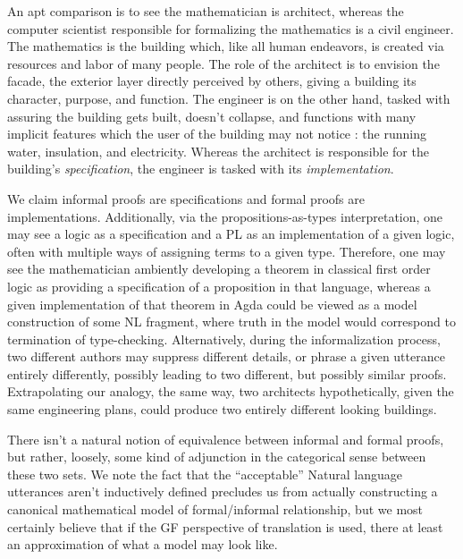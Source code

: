 An apt comparison is to see the mathematician is architect, whereas the computer
scientist responsible for formalizing the mathematics is a civil engineer. The
mathematics is the building which, like all human endeavors, is created via
resources and labor of many people. The role of the architect is to envision the
facade, the exterior layer directly perceived by others, giving a building its
character, purpose, and function. The engineer is on the other hand, tasked with
assuring the building gets built, doesn't collapse, and functions with many
implicit features which the user of the building may not notice : the running
water, insulation, and electricity. Whereas the architect is responsible for the
building's \emph{specification}, the engineer is tasked with its
\emph{implementation}.

We claim informal proofs are specifications and formal proofs are implementations.
Additionally, via the propositions-as-types interpretation, one may see a logic
as a specification and a PL as an implementation of a given logic, 
often with multiple ways of assigning terms to a given type. Therefore, one may
see the mathematician ambiently developing a theorem in classical first order
logic as providing a specification of a proposition in that language, whereas a given
implementation of that theorem in Agda could be viewed as a model construction
of some NL fragment, where truth in the model would correspond to termination of
type-checking. Alternatively, during the informalization process, two different
authors may suppress different details, or phrase a given utterance entirely
differently, possibly leading to two different, but possibly similar proofs.
Extrapolating our analogy,
the same way, two architects hypothetically, given the same engineering plans,
could produce two entirely different looking buildings.

There isn't a natural notion of equivalence between informal and formal proofs,
but rather, loosely, some kind of adjunction in the categorical sense between
these two sets. We note the fact that the ``acceptable'' Natural language
utterances aren't inductively defined precludes us from actually constructing a
canonical mathematical model of formal/informal relationship, but we most certainly
believe that if the GF perspective of translation is used, there at least an
approximation of what a model may look like.


